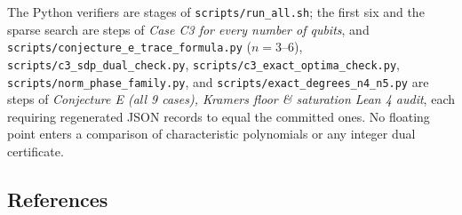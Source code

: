\documentclass[11pt,a4paper]{article}
\begin{document}
The Python verifiers are stages of \nolinkurl{scripts/run_all.sh}; the first six and the sparse search are steps of
\emph{Case C3 for every number of qubits}, and \nolinkurl{scripts/conjecture_e_trace_formula.py} (\(n=3\text{–}6\)),
\nolinkurl{scripts/c3_sdp_dual_check.py}, \nolinkurl{scripts/c3_exact_optima_check.py}, \nolinkurl{scripts/norm_phase_family.py}, and
\nolinkurl{scripts/exact_degrees_n4_n5.py} are steps of \emph{Conjecture E (all 9 cases), Kramers floor \& saturation
Lean 4 audit}, each requiring regenerated JSON records to equal the committed ones. No floating point
enters a comparison of characteristic polynomials or any integer dual certificate.

\subsection{References}\label{references}
\end{document}
